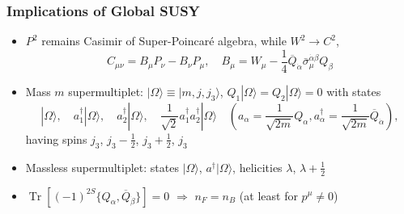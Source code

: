 \documentclass[10pt,aspectratio=169]{beamer}
\DeclareMathOperator{\Tr}{Tr}
\begin{document}
\begin{frame}
  \frametitle{Implications of Global SUSY}
  \begin{itemize}\itemsep1em
  \item {\color{blue} $P^2$ remains Casimir of Super-Poincar\'{e} algebra},
    while $W^2 \to C^2$,
    \begin{equation*}
      C_{\mu\nu} = B_\mu P_\nu - B_\nu P_\mu , \quad
      B_\mu = W_\mu - \frac{1}{4} \overline{Q}_{\dot{\alpha}}
      \bar{\sigma}_\mu^{\dot{\alpha} \beta} Q_\beta
    \end{equation*}
  \item Mass $m$ supermultiplet: $|\Omega \rangle \equiv |m,j,j_3 \rangle$,
    $Q_1 |\Omega \rangle = Q_2 | \Omega \rangle = 0$ with states
    \begin{equation*}
      |\Omega \rangle, \quad a_1^\dagger |\Omega \rangle,
      \quad a_2^\dagger |\Omega \rangle, \quad
      \frac{1}{\sqrt{2}} a_1^\dagger a_2^\dagger | \Omega \rangle \quad
      \left ( a_\alpha = \frac{1}{\sqrt{2 m}} Q_\alpha ,
      a^\dagger_\alpha = \frac{1}{\sqrt{2 m}} \overline{Q}_{\dot{\alpha}}
      \right ) ,
    \end{equation*}
    having spins $j_3$, $j_3 - \frac{1}{2}$, $j_3 + \frac{1}{2}$, $j_3$
  \item Massless supermultiplet: states $|\Omega \rangle$, $a^\dagger |\Omega
    \rangle$, helicities $\lambda$, $\lambda + \frac{1}{2}$
  \item $\Tr \left [ (-1)^{2S} \{ Q_\alpha, \overline{Q}_{\dot{\beta}} \}
    \right ] = 0$ $\Rightarrow$ {\color{blue} $n_F = n_B$} (at least for
    $p^\mu \neq 0$)
  \end{itemize}
\end{frame}
\end{document}
